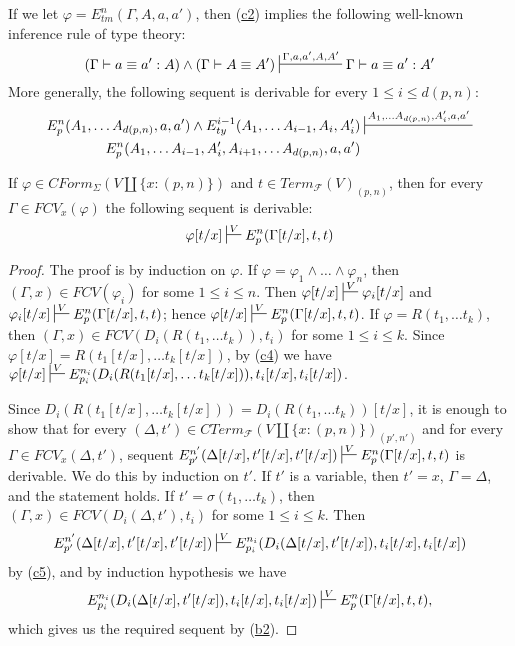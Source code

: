 \documentclass[reqno]{amsart}
\newcommand{\axref}[1]{(\hyperref[ax:#1]{#1})}
\theoremstyle{definition}
\theoremstyle{remark}
\numberwithin{figure}{section}
\begin{document}
If we let $\varphi = E^n_{tm}(\Gamma, A, a, a')$, then \axref{c2} implies the following well-known inference rule of type theory:
\[ (\Gamma \vdash a \equiv a' : A) \land (\Gamma \vdash A \equiv A') \sststile{}{\Gamma, a, a', A, A'} \Gamma \vdash a \equiv a' : A' \]
More generally, the following sequent is derivable for every $1 \leq i \leq d(p,n)$:
\begin{align*}
E^n_p(A_1, \ldots A_{d(p,n)}, a, a') \land E^{i-1}_{ty}(A_1, \ldots A_{i-1}, A_i, A_i') & \sststile{}{A_1, \ldots A_{d(p,n)}, A_i', a, a'} \\
E^n_p(A_1, \ldots A_{i-1}, A_i', A_{i+1}, \ldots A_{d(p,n)}, a, a') &
\end{align*}

\begin{lem}
If $\varphi \in CForm_\Sigma(V \amalg \{ x : (p,n) \})$ and $t \in Term_\mathcal{F}(V)_{(p,n)}$,
then for every $\Gamma \in FCV_x(\varphi)$ the following sequent is derivable:
\[ \varphi[t/x] \sststile{}{V} E^n_p(\Gamma[t/x],t,t) \]
\end{lem}
\begin{proof}
The proof is by induction on $\varphi$.
If $\varphi = \varphi_1 \land \ldots \land \varphi_n$, then $(\Gamma,x) \in FCV(\varphi_i)$ for some $1 \leq i \leq n$.
Then $\varphi[t/x] \sststile{}{V} \varphi_i[t/x]$ and $\varphi_i[t/x] \sststile{}{V} E^n_p(\Gamma[t/x],t,t)$; hence $\varphi[t/x] \sststile{}{V} E^n_p(\Gamma[t/x],t,t)$.
If $\varphi = R(t_1, \ldots t_k)$, then $(\Gamma,x) \in FCV(D_i(R(t_1, \ldots t_k)), t_i)$ for some $1 \leq i \leq k$.
Since $\varphi[t/x] = R(t_1[t/x], \ldots t_k[t/x])$, by \axref{c4} we have $\varphi[t/x] \sststile{}{V} E^{n_i}_{p_i}(D_i(R(t_1[t/x], \ldots t_k[t/x])), t_i[t/x], t_i[t/x])$.

Since $D_i(R(t_1[t/x], \ldots t_k[t/x])) = D_i(R(t_1, \ldots t_k))[t/x]$, it is enough to show that for every $(\Delta,t') \in CTerm_\mathcal{F}(V \amalg \{ x : (p,n) \})_{(p',n')}$
and for every $\Gamma \in FCV_x(\Delta,t')$, sequent $E^{n'}_{p'}(\Delta[t/x], t'[t/x], t'[t/x]) \sststile{}{V} E^n_p(\Gamma[t/x],t,t)$ is derivable.
We do this by induction on $t'$.
If $t'$ is a variable, then $t' = x$, $\Gamma = \Delta$, and the statement holds.
If $t' = \sigma(t_1, \ldots t_k)$, then $(\Gamma,x) \in FCV(D_i(\Delta,t'), t_i)$ for some $1 \leq i \leq k$.
Then
\[ E^{n'}_{p'}(\Delta[t/x], t'[t/x], t'[t/x]) \sststile{}{V} E^{n_i}_{p_i}(D_i(\Delta[t/x], t'[t/x]), t_i[t/x], t_i[t/x]) \]
by \axref{c5}, and by induction hypothesis we have
\[ E^{n_i}_{p_i}(D_i(\Delta[t/x], t'[t/x]), t_i[t/x], t_i[t/x]) \sststile{}{V} E^n_p(\Gamma[t/x],t,t), \]
which gives us the required sequent by \axref{b2}.
\end{proof}
\end{document}
